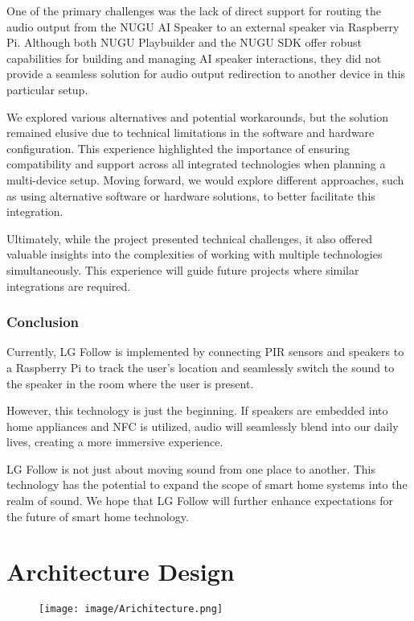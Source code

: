 \documentclass[conference]{IEEEtran}
\begin{document}
One of the primary challenges was the lack of direct support for routing the audio output from the NUGU AI Speaker to an external speaker via Raspberry Pi. Although both NUGU Playbuilder and the NUGU SDK offer robust capabilities for building and managing AI speaker interactions, they did not provide a seamless solution for audio output redirection to another device in this particular setup.

We explored various alternatives and potential workarounds, but the solution remained elusive due to technical limitations in the software and hardware configuration. This experience highlighted the importance of ensuring compatibility and support across all integrated technologies when planning a multi-device setup. Moving forward, we would explore different approaches, such as using alternative software or hardware solutions, to better facilitate this integration.

Ultimately, while the project presented technical challenges, it also offered valuable insights into the complexities of working with multiple technologies simultaneously. This experience will guide future projects where similar integrations are required.\\

\subsubsection{Conclusion}
Currently, LG Follow is implemented by connecting PIR sensors and speakers to a Raspberry Pi to track the user's location and seamlessly switch the sound to the speaker in the room where the user is present.

However, this technology is just the beginning. If speakers are embedded into home appliances and NFC is utilized, audio will seamlessly blend into our daily lives, creating a more immersive experience.

LG Follow is not just about moving sound from one place to another. This technology has the potential to expand the scope of smart home systems into the realm of sound. We hope that LG Follow will further enhance expectations for the future of smart home technology.

\clearpage

\onecolumn
\appendix

\section{Architecture Design}
\begin{figure}[h!]
    \centering
    \texttt{[image: image/Arichitecture.png]}
    \label{fig:fullpage}
\end{figure}
\end{document}
